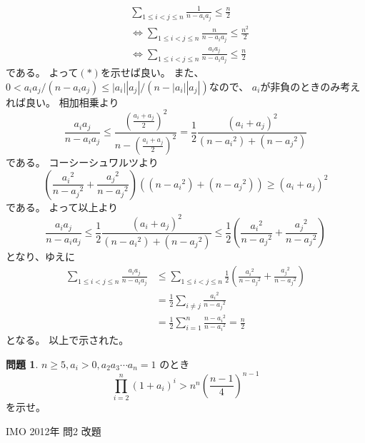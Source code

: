 \documentclass[uplatex, a5paper]{jsarticle}
\makeatletter
\theoremstyle{definition}
\newtheorem{prob}{問題}
\renewenvironment{proof}[1][\proofname]{
  \pushQED{\qed}%
  \normalfont \topsep6\p@\@plus6\p@\relax
  \trivlist
  \item[\hskip\labelsep
    #1\@addpunct{\textbf{.}}]\ignorespaces
}{%
  \popQED\endtrivlist\@endpefalse
}
\providecommand{\proofname}{証明}
\def\qed{\hfill $\Box$}
\makeatother
\begin{document}
\begin{proof}
  \begin{align*}
    &\sum_{1\leq i < j \leq n}\frac{1}{n-a_ia_j} \leq \frac{n}{2} \\
    &\Leftrightarrow \sum_{1\leq i < j \leq n}\frac{n}{n-a_ia_j} \leq \frac{n^2}{2} \\
    &\Leftrightarrow \sum_{1\leq i < j \leq n}\frac{a_ia_j}{n-a_ia_j} \leq \frac{n}{2} \tag{\(*\)}
  \end{align*}
  である。
  よって\((*)\)を示せば良い。
  また、\(0 < a_ia_j/(n-a_ia_j) \leq |a_i| |a_j| / ( n - |a_i| |a_j|)\)なので、
  \(a_i\)が非負のときのみ考えれば良い。
  相加相乗より
  \[
  \frac{a_ia_j}{n-a_ia_j} \leq \frac{\left( \frac{a_i+a_j}{2} \right) ^2 }{n-\left( \frac{a_i+a_j}{2}\right) ^2}
  = \frac{1}{2} \frac{ (a_i+a_j)^2}{(n-{a_i}^2) + (n-{a_j}^2)}
  \]
  である。
  コーシーシュワルツより
  \[
  \left( \frac{ {a_i}^2 }{n-{a_j}^2} + \frac{ {a_j}^2 }{n-{a_j}^2} \right) \left( (n-{a_i}^2) + (n-{a_j}^2) \right)
  \geq \left( a_i + a_j \right) ^2
  \]
  である。
  よって以上より
  \[
  \frac{a_ia_j}{n-a_ia_j} \leq \frac{1}{2} \frac{ (a_i+a_j)^2}{(n-{a_i}^2) + (n-{a_j}^2)} \leq \frac{1}{2}\left( \frac{
  {a_i}^2 }{n-{a_j}^2} + \frac{ {a_j}^2 }{n-{a_j}^2} \right)
  \]
  となり、ゆえに
  \begin{align*}
    \sum_{1\leq i < j \leq n}\frac{a_ia_j}{n-a_ia_j}
    &\leq \sum_{1\leq i < j \leq n}\frac{1}{2}
    \left( \frac{ {a_i}^2 }{n-{a_j}^2} + \frac{ {a_j}^2 }{n-{a_j}^2} \right) \\
    &= \frac{1}{2}\sum_{i\neq j}\frac{{a_i}^2}{n-{a_j}^2} \\
    &= \frac{1}{2}\sum_{i=1}^n \frac{n-{a_i}^2}{n-{a_i}^2} = \frac{n}{2}
  \end{align*}
  となる。
  以上で示された。
\end{proof}












\newpage

\begin{prob}
  \(n \geq 5 , a_i > 0 , a_2a_3 \cdots a_n = 1\)
  のとき
  \[
  \prod_{i=2}^n (1+a_i)^i > n^n \left( \frac{n-1}{4} \right) ^{n-1}
  \]
  を示せ。
  \begin{flushright}
    IMO 2012年 問2 改題
  \end{flushright}
\end{prob}
\end{document}
